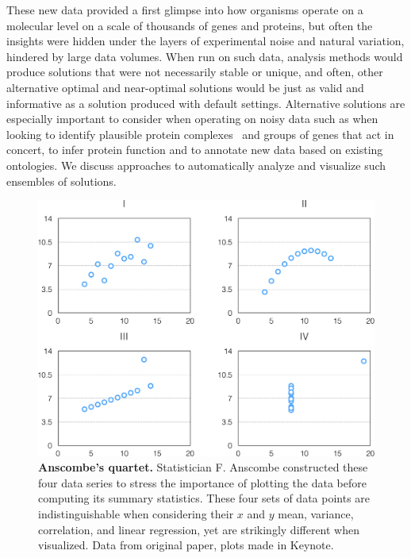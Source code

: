 \documentclass[12pt]{cmuthesis}
\begin{document}

These new data provided a first glimpse into how organisms operate on a molecular level on a scale of thousands of genes and proteins, but often the insights were hidden under the layers of experimental noise and natural variation, hindered by large data volumes. When run on such data, analysis methods would produce solutions that were not necessarily stable or unique, and often, other alternative optimal and near-optimal solutions would be just as valid and informative as a solution produced with default settings. Alternative solutions are especially important to consider when operating on noisy data such as when looking to identify plausible protein complexes~\cite{VanDongen2000} and groups of genes that act in concert, to infer protein function and to annotate new data based on existing ontologies. We discuss approaches to automatically analyze and visualize such ensembles of solutions.
 

\begin{figure}[ht]
  \centering
  \includegraphics[width=0.8\linewidth]{figures/anscombes_quartet}
  \caption{\textbf{Anscombe's quartet.} Statistician F. Anscombe constructed these four data series to stress the importance of plotting the data before computing its summary statistics. These four sets of data points are indistinguishable when considering their $x$ and $y$ mean, variance, correlation, and linear regression, yet are strikingly different when visualized. Data from original paper, plots made in Keynote.}
  \label{fig:intro:anscombe}
\end{figure}
\end{document}
